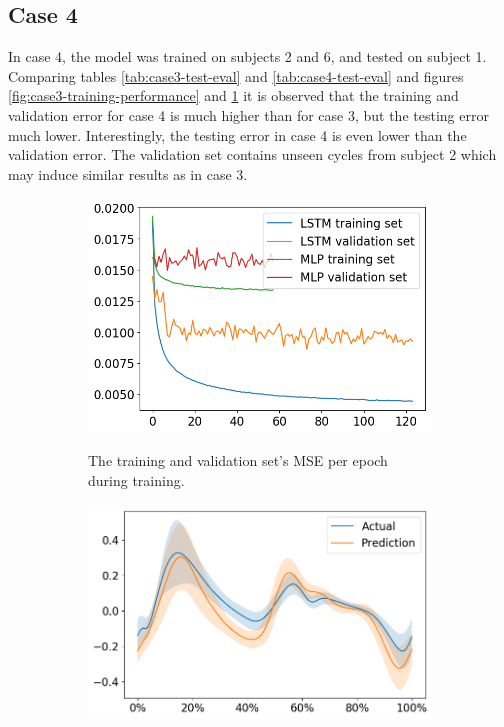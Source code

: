 \documentclass[../main.tex]{subfiles}
\begin{document}
\subsection{Case 4}
\label{sec:results-case4}
In case 4, the model was trained on subjects 2 and 6, and tested on subject 1.
Comparing tables \ref{tab:case3-test-eval} and \ref{tab:case4-test-eval} and figures \ref{fig:case3-training-performance} and \ref{fig:case4-training-performance} it is observed that the training and validation error for case 4 is much higher than for case 3, but the testing error much lower.
Interestingly, the testing error in case 4 is even lower than the validation error.
The validation set contains unseen cycles from subject 2 which may induce similar results as in case 3.
\begin{figure}[ht!]
    \captionsetup[subfigure]{aboveskip=-12pt}
     \centering
     \begin{subfigure}[b]{0.475\textwidth}
         \centering
         \includegraphics[width=\textwidth]{img/results/training_history/Case4_LSTMvsMLP_training.png}
         \label{fig:case4-training-performance}
         \caption{The training and validation set's \ac{MSE} per epoch during training.}
     \end{subfigure}
     \hfill
     \begin{subfigure}[b]{0.515\textwidth}
         \centering
         \includegraphics[width=\textwidth]{img/results/test_prediction_evaluation/Case4_LSTM_test_prediction.png}

\end{subfigure}
\end{figure}
\end{document}
